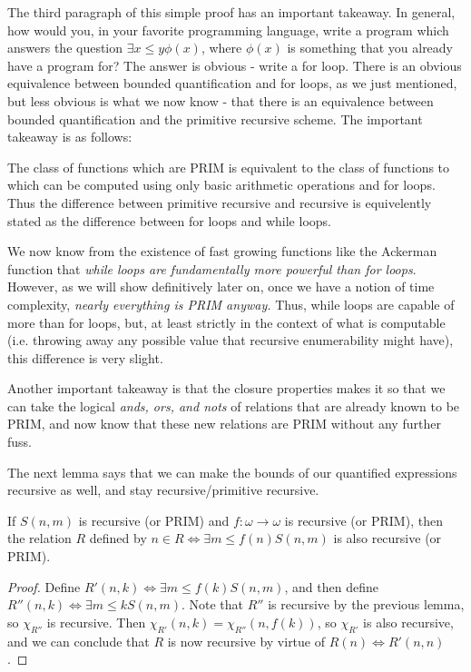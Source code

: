 The third paragraph of this simple proof has an important takeaway. In general, how would you, in your favorite programming language, write a program which answers the question $\exists x \leq y \phi(x)$, where $\phi(x)$ is something that you already have a program for? The answer is obvious - write a for loop. There is an obvious equivalence between bounded quantification and for loops, as we just mentioned, but less obvious is what we now know - that there is an equivalence between bounded quantification and the primitive recursive scheme. The important takeaway is as follows:
\begin{center}
    The class of functions which are PRIM is equivalent to the class of functions to which can be computed using only basic arithmetic operations and for loops. Thus the difference between primitive recursive and recursive is equivelently stated as the difference between for loops and while loops.
\end{center}
 We now know from the existence of fast growing functions like the Ackerman function that \textit{while loops are fundamentally more powerful than for loops}. However, as we will show definitively later on, once we have a notion of time complexity, \textit{nearly everything is PRIM anyway.} Thus, while loops are capable of more than for loops, but, at least strictly in the context of what is computable (i.e. throwing away any possible value that recursive enumerability might have), this difference is very slight.
 \par Another important takeaway is that the closure properties makes it so that we can take the logical \textit{ands, ors, and nots} of relations that are already known to be PRIM, and now know that these new relations are PRIM without any further fuss. 
 \par The next lemma says that we can make the bounds of our quantified expressions recursive as well, and stay recursive/primitive recursive.
\begin{lemma}
    If $S(n,m)$ is recursive (or PRIM) and $f:\omega \to \omega$ is recursive (or PRIM), then the relation $R$ defined by $n \in R \iff \exists m \leq f(n) S(n,m)$ is also recursive (or PRIM).
\end{lemma}
\begin{proof}
    Define $R'(n,k) \iff \exists m \leq f(k) S(n,m)$, and then define $R''(n,k) \iff \exists m \leq k S(n,m)$. Note that $R''$ is recursive by the previous lemma, so $\chi_{R''}$ is recursive. Then $\chi_{R'}(n,k) = \chi_{R''}(n,f(k))$, so $\chi_{R'}$ is also recursive, and we can conclude that $R$ is now recursive by virtue of $R(n) \iff R'(n,n)$.
\end{proof}
